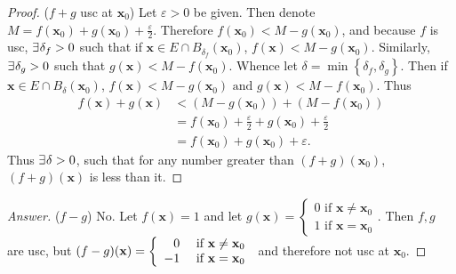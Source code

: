 \documentclass[12pt]{book}
\newcommand{\set}[1]{\left\{ #1 \right\}}
\renewcommand{\i}{\cap}
\newcommand{\x}{\mathbf{x}}
\newcommand{\tand}{\text{ and }}
\renewcommand{\t}[1]{\text{ #1 }}
\renewcommand{\.}{\mkern1mu}
\newcommand{\e}{\varepsilon}
\renewcommand{\qed}{\hfill $\blacksquare$}
\newcommand{\ea}{\hfill $\bf{\dashv}$}
\newenvironment{pf}{\begin{proof}\setlength{\parindent}{\normalparindent}\setlength{\parskip}{\normalparskip}}{\end{proof}}
\newenvironment{ans}{\begin{proof}[Answer] \renewcommand{\qed}{\ea}\setlength{\parindent}{\normalparindent}\setlength{\parskip}{\normalparskip}}{\end{proof}}
\theoremstyle{theorem}
\renewcommand{\bf}[1]{\boldsymbol{#1}}
\newlength{\normalparindent}
\newlength{\normalparskip}
\begin{document}
		\begin{pf}
		($f+g$ usc at $\x_0$) Let $\e > 0$ be given. Then denote $M = f(\x_0) + g(\x_0) + \frac{\e}{2}$. Therefore $f(\x_0) < M-g(\x_0)$, and because $f$ is usc, $\exists\. \delta_f > 0$ such that if $\x\in E\i B_{\delta_f}(\x_0)$, $f(\x) < M - g(\x_0)$. Similarly, $\exists\. \delta_g > 0$ such that $g(\x) < M - f(\x_0)$. Whence let $\delta = \min\set{\delta_f, \delta_g}.$ Then if $\x\in E\i B_\delta(\x_0)$, $f(\x) < M-g(\x_0) \tand g(\x) < M - f(\x_0)$. Thus
			\begin{align*}
			f(\x) + g(\x) &< (M - g(\x_0)) + (M - f(\x_0))\\
				&= f(\x_0) + \frac{\e}{2} + g(\x_0) + \frac{\e}{2}\\
				&= f(\x_0) + g(\x_0) + \e.
			\end{align*}
		Thus $\exists\. \delta > 0$, such that for any number greater than $(f+g)(\x_0)$, $(f+g)(\x)$ is less than it. 
		\end{pf}
		\begin{ans}
		($f-g$) No. Let $f(\x) = 1$ and let $g(\x) = \left\{\begin{array}{l} 0 \t{if} \x\neq \x_0\\ 1 \t{if} \x=\x_0 \end{array}\right.$. Then $f,g$ are usc, but $(f-g)(\x) = \left\{ \begin{array}{r l} 0 &\t{if} \x\neq \x_0\\ -1 &\t{if} \x=\x_0 \end{array}\right.$ and therefore not usc at $\x_0$.
		\end{ans}
		
\end{document}
